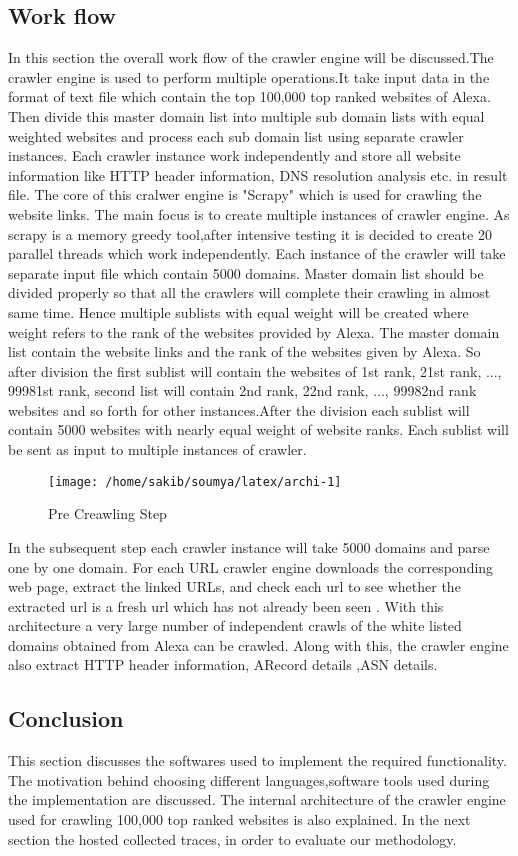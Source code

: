 \subsection{Work flow}
In this section the overall work flow of the crawler engine will be discussed.The crawler engine is used to perform multiple operations.It take input data in the format of text file which contain the top 100,000 top ranked websites of Alexa. Then divide this master domain list into multiple sub domain lists with equal weighted websites and process each sub domain list using separate crawler instances. Each crawler instance work independently and store all website information like HTTP header information, DNS resolution analysis etc. in result file. The core of this cralwer engine is "Scrapy" which is used for crawling the website links. The main focus is to create multiple instances of crawler engine. As scrapy is a memory greedy tool,after intensive testing it is decided to create 20 parallel threads which work independently. Each instance of the crawler will take separate input file which contain 5000 domains. Master domain list should be divided properly so that all the crawlers will complete their crawling in almost same time. Hence multiple sublists with equal weight will be created where weight refers to the rank of the websites provided by Alexa. The master domain list contain the website links and the rank of the websites given by Alexa. So after division the first sublist will contain the websites of 1st rank, 21st rank, ..., 99981st rank, second list will contain 2nd rank, 22nd rank, ..., 99982nd rank websites and so forth for other instances.After the division each sublist will contain 5000 websites with nearly equal weight of website ranks. Each sublist will be sent as input to multiple instances of crawler. 

\begin{figure}[h]
\texttt{[image: /home/sakib/soumya/latex/archi-1]}
\centering
\caption{Pre Creawling Step}
\end{figure}

In the subsequent step each crawler instance will take 5000 domains and parse one by one domain. For each URL crawler engine downloads the corresponding web page, extract the linked URLs, and check each url to see whether the extracted url is a fresh url which has not already been seen . With this architecture a very large number of independent crawls of the white listed domains obtained from Alexa can be crawled. Along with this, the crawler engine also extract HTTP header information, ARecord details ,ASN details.

\subsection{Conclusion}
This section discusses the softwares used to implement the required functionality. The motivation behind choosing different languages,software tools used during the implementation are discussed. The internal architecture of the crawler engine used for crawling 100,000 top ranked websites is also explained. In the next section the hosted collected traces, in order to evaluate our methodology.